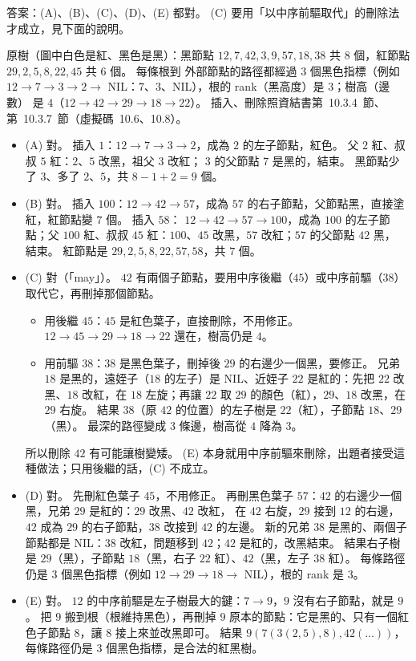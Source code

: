 \begin{pastsoln}
答案：(A)、(B)、(C)、(D)、(E) 都對。 (C) 要用「以中序前驅取代」的刪除法才成立，見下面的說明。

原樹（圖中白色是紅、黑色是黑）：黑節點 $12, 7, 42, 3, 9, 57, 18, 38$ 共 $8$ 個，紅節點 $29, 2, 5, 8, 22, 45$ 共 $6$ 個。 每條根到
外部節點的路徑都經過 $3$ 個黑色指標（例如 $12 \to 7 \to 3 \to 2 \to$ NIL：$7$、$3$、NIL），根的 rank（黑高度）是 $3$；樹高（邊數）
是 $4$（$12 \to 42 \to 29 \to 18 \to 22$）。 插入、刪除照資結書第~10.3.4~節、第~10.3.7~節（虛擬碼~10.6、10.8）。

\begin{itemize}
\item (A) 對。 插入 $1$：$12 \to 7 \to 3 \to 2$，成為 $2$ 的左子節點，紅色。 父 $2$ 紅、叔叔 $5$ 紅：$2$、$5$ 改黑，祖父 $3$ 改紅；
$3$ 的父節點 $7$ 是黑的，結束。 黑節點少了 $3$、多了 $2$、$5$，共 $8 - 1 + 2 = 9$ 個。
\item (B) 對。 插入 $100$：$12 \to 42 \to 57$，成為 $57$ 的右子節點，父節點黑，直接塗紅，紅節點變 $7$ 個。 插入 $58$：
$12 \to 42 \to 57 \to 100$，成為 $100$ 的左子節點；父 $100$ 紅、叔叔 $45$ 紅：$100$、$45$ 改黑，$57$ 改紅；$57$ 的父節點 $42$ 黑，
結束。 紅節點是 $29, 2, 5, 8, 22, 57, 58$，共 $7$ 個。
\item (C) 對（「may」）。 $42$ 有兩個子節點，要用中序後繼（$45$）或中序前驅（$38$）取代它，再刪掉那個節點。
\begin{itemize}
\item 用後繼 $45$：$45$ 是紅色葉子，直接刪除，不用修正。 $12 \to 45 \to 29 \to 18 \to 22$ 還在，樹高仍是 $4$。
\item 用前驅 $38$：$38$ 是黑色葉子，刪掉後 $29$ 的右邊少一個黑，要修正。 兄弟 $18$ 是黑的，遠姪子（$18$ 的左子）是 NIL、近姪子
$22$ 是紅的：先把 $22$ 改黑、$18$ 改紅，在 $18$ 左旋；再讓 $22$ 取 $29$ 的顏色（紅），$29$、$18$ 改黑，在 $29$ 右旋。 結果
$38$（原 $42$ 的位置）的左子樹是 $22$（紅），子節點 $18$、$29$（黑）。 最深的路徑變成 $3$ 條邊，樹高從 $4$ 降為 $3$。
\end{itemize}
所以刪除 $42$ 有可能讓樹變矮。 (E) 本身就用中序前驅來刪除，出題者接受這種做法；只用後繼的話，(C) 不成立。
\item (D) 對。 先刪紅色葉子 $45$，不用修正。 再刪黑色葉子 $57$：$42$ 的右邊少一個黑，兄弟 $29$ 是紅的：$29$ 改黑、$42$ 改紅，
在 $42$ 右旋，$29$ 接到 $12$ 的右邊，$42$ 成為 $29$ 的右子節點，$38$ 改接到 $42$ 的左邊。 新的兄弟 $38$ 是黑的、兩個子節點都是
NIL：$38$ 改紅，問題移到 $42$；$42$ 是紅的，改黑結束。 結果右子樹是 $29$（黑），子節點 $18$（黑，右子 $22$ 紅）、$42$（黑，左子
$38$ 紅）。 每條路徑仍是 $3$ 個黑色指標（例如 $12 \to 29 \to 18 \to$ NIL），根的 rank 是 $3$。
\item (E) 對。 $12$ 的中序前驅是左子樹最大的鍵：$7 \to 9$，$9$ 沒有右子節點，就是 $9$。 把 $9$ 搬到根（根維持黑色），再刪掉
$9$ 原本的節點：它是黑的、只有一個紅色子節點 $8$，讓 $8$ 接上來並改黑即可。 結果
$9(7(3(2, 5), 8), 42(\ldots))$，每條路徑仍是 $3$ 個黑色指標，是合法的紅黑樹。
\end{itemize}
\end{pastsoln}
